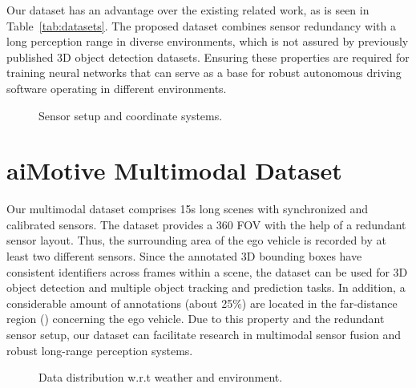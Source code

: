 \documentclass{article}
\begin{document}
Our dataset has an advantage over the existing related work, as is seen in Table~\ref{tab:datasets}. The proposed dataset combines sensor redundancy with a long perception range in diverse environments, which is not assured by previously published 3D object detection datasets. Ensuring these properties are required for training neural networks that can serve as a base for robust autonomous driving software operating in different environments.


\begin{figure}
\begin{floatrow}
{\caption{Sensor setup and coordinate systems.}\label{fig:sensor_setup}
}

\end{floatrow}
\end{figure}


\section{aiMotive Multimodal Dataset}
\label{sec:dataset}

Our multimodal dataset comprises 15s long scenes with synchronized and calibrated sensors. The dataset provides a 360 FOV with the help of a redundant sensor layout. Thus, the surrounding area of the ego vehicle is recorded by at least two different sensors. Since the annotated 3D bounding boxes have consistent identifiers across frames within a scene, the dataset can be used for 3D object detection and multiple object tracking and prediction tasks. In addition, a considerable amount of annotations (about 25\%) are located in the far-distance region () concerning the ego vehicle. Due to this property and the redundant sensor setup, our dataset can facilitate research in multimodal sensor fusion and robust long-range perception systems.

\begin{figure}
\begin{floatrow}
{\caption{Data distribution w.r.t weather and environment.}\label{tab:data_distr}
}
\end{floatrow}
\end{figure}
\end{document}
